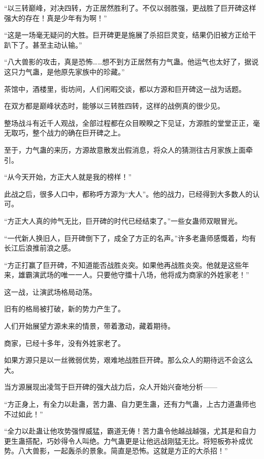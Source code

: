 
\begin{this_body}

“以三转巅峰，对决四转，方正居然胜利了。不仅以弱胜强，更战胜了巨开碑这样强大的存在！真是少年有为啊！”

“这是一场毫无疑问的大胜。巨开碑更是施展了杀招巨灵变，结果仍旧被方正给干趴下了。甚至主动认输。”

“八大兽影的攻击，真是恐怖……想不到方正居然有力气蛊。他运气也太好了，据说这只力气蛊，是他原先家族中的珍藏。”

茶馆中，酒楼里，街坊间，人们闲暇交谈，都以方源和巨开碑这一战为话题。

在双方都是巅峰状态时，能够以三转胜四转，这样的战例真的很少见。

整场战斗有近千人观战，全部过程都在众目睽睽之下见证，方源胜的堂堂正正，毫无取巧，整个战力的确在巨开碑之上。

至于，力气蛊的来历，方源故意散发出假消息，将众人的猜测往古月家族上面牵引。

“从今天开始，方正大人就是我的榜样！”

此战之后，很多人口中，都称呼方源为“大人”。他的战力，已经得到大多数人的认可。

“方正大人真的帅气无比，巨开碑的时代已经结束了。”一些女蛊师双眼冒光。

“一代新人换旧人，巨开碑倒下了，成全了方正的名声。”许多老蛊师感慨着，均有长江后浪推前浪之感。

“方正打赢了巨开碑，不知道能否战胜炎突。如果他再战胜炎突。他就是这些年来，雄霸演武场的唯一一人。只要他守擂十八场，他将成为商家的外姓家老！”

这一战，让演武场格局动荡。

旧有的格局被打破，新的势力产生了。

人们开始展望方源未来的情景，带着激动，藏着期待。

商家，已经十多年，没有外姓家老了。

如果方源只是以一丝微弱优势，艰难地战胜巨开碑。那么众人的期待远不会这么大。

当方源展现出凌驾于巨开碑的强大战力后，众人开始兴奋地分析——

“方正身上，有全力以赴蛊，苦力蛊、自力更生蛊，还有力气蛊，上古力道蛊师也不过如此！”

“全力以赴蛊让他攻势强悍威猛，霸道无俦！苦力蛊令他越战越强，尤其是和自力更生蛊搭配，巧妙得令人叫绝。力气蛊更是让他远战刚猛无比。将短板弥补成优势。八大兽影，一起轰杀的景象。简直是恐怖。这就是方正的大杀招！”


\end{this_body}
